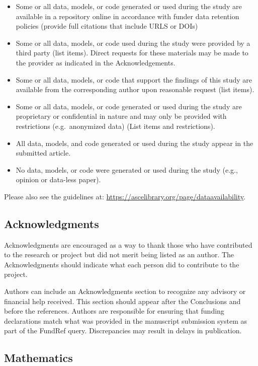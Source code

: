 \documentclass[NewProceedings, InsideFigs,LineNumbers]{asce-quarto}
\begin{document}
\begin{itemize}
\item
  Some or all data, models, or code generated or used during the study
  are available in a repository online in accordance with funder data
  retention policies (provide full citations that include URLS or DOIs)
\item
  Some or all data, models, or code used during the study were provided
  by a third party (list items). Direct requests for these materials may
  be made to the provider as indicated in the Acknowledgements.
\item
  Some or all data, models, or code that support the findings of this
  study are available from the corresponding author upon reasonable
  request (list items).
\item
  Some or all data, models, or code generated or used during the study
  are proprietary or confidential in nature and may only be provided
  with restrictions (e.g.~anonymized data) (List items and
  restrictions).
\item
  All data, models, and code generated or used during the study appear
  in the submitted article.
\item
  No data, models, or code were generated or used during the study
  (e.g., opinion or data-less paper).
\end{itemize}

Please also see the guidelines at:
\url{https://ascelibrary.org/page/dataavailability}.

\subsection{Acknowledgments}\label{acknowledgments}

Acknowledgments are encouraged as a way to thank those who have
contributed to the research or project but did not merit being listed as
an author. The Acknowledgments should indicate what each person did to
contribute to the project.

Authors can include an Acknowledgments section to recognize any advisory
or financial help received. This section should appear after the
Conclusions and before the references. Authors are responsible for
ensuring that funding declarations match what was provided in the
manuscript submission system as part of the FundRef query. Discrepancies
may result in delays in publication.

\subsection{Mathematics}\label{mathematics}
\end{document}
